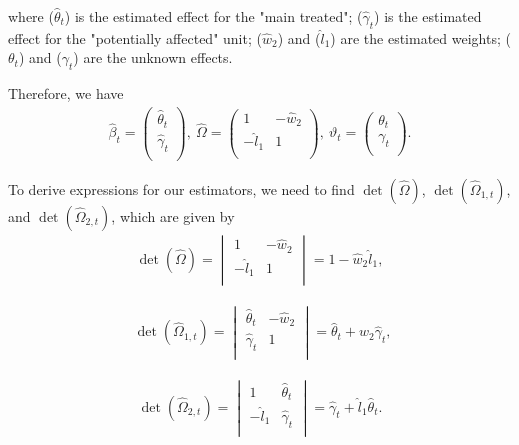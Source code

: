 where ($\widehat{\theta}_{t}$) is the estimated effect for the "main treated"; ($\widehat{\gamma}_{t}$) is the estimated effect for the "potentially affected" unit; ($\widehat{w}_{2}$) and ($\widehat{l}_{1}$) are the estimated weights; ($\theta_{t}$) and ($\gamma_{t}$) are the unknown effects.


Therefore, we have
\begin{align*}
\widehat{\beta}_t=
\begin{pmatrix}
\widehat{\theta}_{t} \\
\widehat{\gamma}_{t} \\
\end{pmatrix}, \    
\widehat{\Omega}=
\begin{pmatrix}
1 & - \widehat{w}_{2}  \\
- \widehat{l}_{1} & 1 \\
\end{pmatrix}, \   
\vartheta_t=
\begin{pmatrix}
\theta_{t} \\
\gamma_{t} \\
\end{pmatrix}.
\end{align*}

To derive expressions for our estimators, we need to find  $\det(\widehat{\Omega})$, $\det(\widehat{\Omega}_{1,t})$, and $\det(\widehat{\Omega}_{2,t})$, which are given by
\begin{align*}
\det(\widehat{\Omega})=
\begin{vmatrix}
1 & - \widehat{w}_{2}  \\
- \widehat{l}_{1} & 1 \\
\end{vmatrix} 
= 1-\widehat{w}_{2}\widehat{l}_{1},
\end{align*}

\begin{align*}
\ \ \det(\widehat{\Omega}_{1,t})=
\begin{vmatrix}
\widehat{\theta}_{t} & - \widehat{w}_{2}  \\
\widehat{\gamma}_{t} & 1 \\
\end{vmatrix} 
= \widehat{\theta}_{t}+\widehat{w}_{2}\widehat{\gamma}_{t},
\end{align*}

\begin{align*}
\det(\widehat{\Omega}_{2,t})=
\begin{vmatrix}
1 & \widehat{\theta}_{t} \\
- \widehat{l}_{1} & \widehat{\gamma}_{t}\\
\end{vmatrix}
= \widehat{\gamma}_{t}+\widehat{l}_{1}\widehat{\theta}_{t}.
\end{align*}\\

